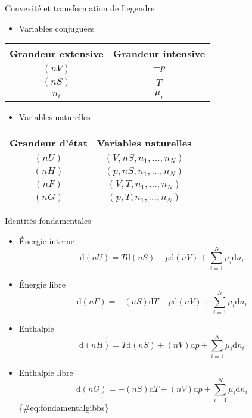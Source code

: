 \documentclass[
  ignorenonframetext,
]{beamer}
\providecommand{\tightlist}{%
  \setlength{\itemsep}{0pt}\setlength{\parskip}{0pt}}
\begin{document}
\begin{frame}{Convexité et transformation de Legendre}
\protect\hypertarget{convexituxe9-et-transformation-de-legendre}{}
\begin{itemize}
\tightlist
\item
  Variables conjuguées
\end{itemize}

\begin{longtable}[]{@{}cc@{}}
\toprule
Grandeur extensive & Grandeur intensive\tabularnewline
\midrule
\endhead
\(\left ( n V \right )\) & \(-p\)\tabularnewline
\(\left ( n S \right )\) & \(T\)\tabularnewline
\(n _ i\) & \(\mu _ i\)\tabularnewline
\bottomrule
\end{longtable}

\begin{itemize}
\tightlist
\item
  Variables naturelles
\end{itemize}

\begin{longtable}[]{@{}cc@{}}
\toprule
Grandeur d'état & Variables naturelles\tabularnewline
\midrule
\endhead
\(\left ( n U \right )\) &
\(\left ( V, n S, n _ 1, \ldots, n _ N \right )\)\tabularnewline
\(\left ( n H \right )\) &
\(\left ( p, n S, n _ 1, \ldots, n _ N \right )\)\tabularnewline
\(\left ( n F \right )\) &
\(\left ( V, T, n _ 1, \ldots, n _ N \right )\)\tabularnewline
\(\left ( n G \right )\) &
\(\left ( p, T, n _ 1, \ldots, n _ N \right )\)\tabularnewline
\bottomrule
\end{longtable}
\end{frame}

\begin{frame}{Identités fondamentales}
\protect\hypertarget{identituxe9s-fondamentales}{}
\begin{itemize}
\tightlist
\item
  Énergie interne \[
  \mathrm{d} \left ( n U \right ) = T \mathrm{d} \left ( n S \right ) - p \mathrm{d} \left ( n V \right ) + \sum _ {i = 1} ^ N \mu _ i \mathrm{d} n _ i
  \]
\item
  Énergie libre \[
  \mathrm{d} \left ( n F \right ) = -\left ( n S \right ) \mathrm{d} T - p \mathrm{d} \left ( n V \right ) + \sum _ {i = 1} ^ N \mu _ i \mathrm{d} n _ i
  \]
\item
  Enthalpie \[
  \mathrm{d} \left ( n H \right ) = T \mathrm{d} \left ( n S \right ) + \left ( n V \right ) \mathrm{d} p + \sum _ {i = 1} ^ N \mu _ i \mathrm{d} n _ i
  \]
\item
  Enthalpie libre \[
  \mathrm{d} \left ( n G \right ) = -\left ( n S \right ) \mathrm{d} T + \left ( n V \right ) \mathrm{d} p + \sum _ {i = 1} ^ N \mu _ i \mathrm{d} n _ i
  \] \{\#eq:fondamentalgibbs\}
\end{itemize}
\end{frame}
\end{document}

